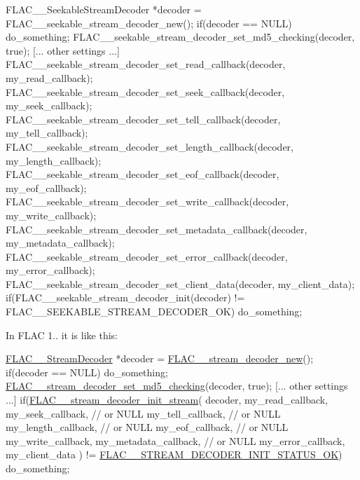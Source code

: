 \begin{DoxyCode}
FLAC\_\_SeekableStreamDecoder *decoder = FLAC\_\_seekable\_stream\_decoder\_new();
\textcolor{keywordflow}{if}(decoder == NULL) do\_something;
FLAC\_\_seekable\_stream\_decoder\_set\_md5\_checking(decoder, \textcolor{keyword}{true});
[... other settings ...]
FLAC\_\_seekable\_stream\_decoder\_set\_read\_callback(decoder, my\_read\_callback);
FLAC\_\_seekable\_stream\_decoder\_set\_seek\_callback(decoder, my\_seek\_callback);
FLAC\_\_seekable\_stream\_decoder\_set\_tell\_callback(decoder, my\_tell\_callback);
FLAC\_\_seekable\_stream\_decoder\_set\_length\_callback(decoder, my\_length\_callback);
FLAC\_\_seekable\_stream\_decoder\_set\_eof\_callback(decoder, my\_eof\_callback);
FLAC\_\_seekable\_stream\_decoder\_set\_write\_callback(decoder, my\_write\_callback);
FLAC\_\_seekable\_stream\_decoder\_set\_metadata\_callback(decoder, my\_metadata\_callback);
FLAC\_\_seekable\_stream\_decoder\_set\_error\_callback(decoder, my\_error\_callback);
FLAC\_\_seekable\_stream\_decoder\_set\_client\_data(decoder, my\_client\_data);
\textcolor{keywordflow}{if}(FLAC\_\_seekable\_stream\_decoder\_init(decoder) != FLAC\_\_SEEKABLE\_STREAM\_DECODER\_OK) do\_something;
\end{DoxyCode}


In F\+L\+AC 1.. it is like this\+:


\begin{DoxyCode}
\hyperlink{struct_f_l_a_c_____stream_decoder}{FLAC\_\_StreamDecoder} *decoder = \hyperlink{group__flac__stream__decoder_ga7159eefc074dfbab4a37462f69326091}{FLAC\_\_stream\_decoder\_new}();
\textcolor{keywordflow}{if}(decoder == NULL) do\_something;
\hyperlink{group__flac__stream__decoder_ga48074d18a17ea88e8272cc8f865ae6e6}{FLAC\_\_stream\_decoder\_set\_md5\_checking}(decoder, \textcolor{keyword}{true});
[... other settings ...]
\textcolor{keywordflow}{if}(\hyperlink{group__flac__stream__decoder_ga32c28a56a2bdfa2333edbd3d991894d7}{FLAC\_\_stream\_decoder\_init\_stream}(
  decoder,
  my\_read\_callback,
  my\_seek\_callback,      \textcolor{comment}{// or NULL}
  my\_tell\_callback,      \textcolor{comment}{// or NULL}
  my\_length\_callback,    \textcolor{comment}{// or NULL}
  my\_eof\_callback,       \textcolor{comment}{// or NULL}
  my\_write\_callback,
  my\_metadata\_callback,  \textcolor{comment}{// or NULL}
  my\_error\_callback,
  my\_client\_data
) != \hyperlink{group__flac__stream__decoder_ggaaed54a24ac6310d29c5cafba79759c44ac94c7e9396f30642f34805e5d626e011}{FLAC\_\_STREAM\_DECODER\_INIT\_STATUS\_OK}) do\_something;
\end{DoxyCode}


